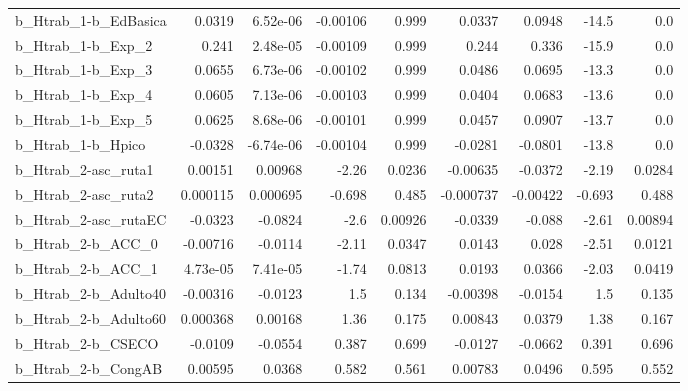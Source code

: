 \begin{tabular}{lrrrrrrrr}
b\_Htrab\_1-b\_EdBasica       &      0.0319 &     6.52e-06 & -0.00106 &    0.999 &     0.0337 &      0.0948 &        -14.5 &           0.0 \\
b\_Htrab\_1-b\_Exp\_2          &       0.241 &     2.48e-05 & -0.00109 &    0.999 &      0.244 &       0.336 &        -15.9 &           0.0 \\
b\_Htrab\_1-b\_Exp\_3          &      0.0655 &     6.73e-06 & -0.00102 &    0.999 &     0.0486 &      0.0695 &        -13.3 &           0.0 \\
b\_Htrab\_1-b\_Exp\_4          &      0.0605 &     7.13e-06 & -0.00103 &    0.999 &     0.0404 &      0.0683 &        -13.6 &           0.0 \\
b\_Htrab\_1-b\_Exp\_5          &      0.0625 &     8.68e-06 & -0.00101 &    0.999 &     0.0457 &      0.0907 &        -13.7 &           0.0 \\
b\_Htrab\_1-b\_Hpico          &     -0.0328 &    -6.74e-06 & -0.00104 &    0.999 &    -0.0281 &     -0.0801 &        -13.8 &           0.0 \\
b\_Htrab\_2-asc\_ruta1        &     0.00151 &      0.00968 &    -2.26 &   0.0236 &   -0.00635 &     -0.0372 &        -2.19 &        0.0284 \\
b\_Htrab\_2-asc\_ruta2        &    0.000115 &     0.000695 &   -0.698 &    0.485 &  -0.000737 &    -0.00422 &       -0.693 &         0.488 \\
b\_Htrab\_2-asc\_rutaEC       &     -0.0323 &      -0.0824 &     -2.6 &  0.00926 &    -0.0339 &      -0.088 &        -2.61 &       0.00894 \\
b\_Htrab\_2-b\_ACC\_0          &    -0.00716 &      -0.0114 &    -2.11 &   0.0347 &     0.0143 &       0.028 &        -2.51 &        0.0121 \\
b\_Htrab\_2-b\_ACC\_1          &    4.73e-05 &     7.41e-05 &    -1.74 &   0.0813 &     0.0193 &      0.0366 &        -2.03 &        0.0419 \\
b\_Htrab\_2-b\_Adulto40       &    -0.00316 &      -0.0123 &      1.5 &    0.134 &   -0.00398 &     -0.0154 &          1.5 &         0.135 \\
b\_Htrab\_2-b\_Adulto60       &    0.000368 &      0.00168 &     1.36 &    0.175 &    0.00843 &      0.0379 &         1.38 &         0.167 \\
b\_Htrab\_2-b\_CSECO          &     -0.0109 &      -0.0554 &    0.387 &    0.699 &    -0.0127 &     -0.0662 &        0.391 &         0.696 \\
b\_Htrab\_2-b\_CongAB         &     0.00595 &       0.0368 &    0.582 &    0.561 &    0.00783 &      0.0496 &        0.595 &         0.552 \\

\end{tabular}
